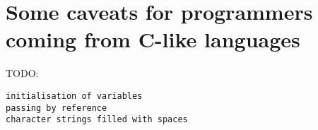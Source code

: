 \section{Some caveats for programmers coming from C-like languages}
TODO:

\begin{verbatim}
initialisation of variables
passing by reference
character strings filled with spaces
\end{verbatim}

